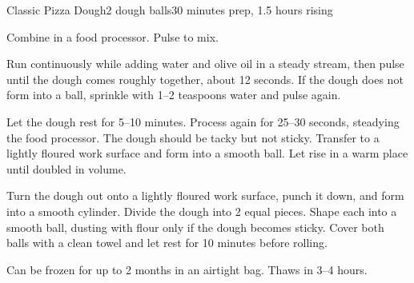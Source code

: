 \documentclass[../Cookbook.tex]{subfiles}
\begin{document}
\begin{recipe}{Classic Pizza Dough}{2 dough balls}{30 minutes prep, 1.5 hours rising}

Combine in a food processor. Pulse to mix.

Run continuously while adding water and olive oil in a steady stream, then pulse until the dough comes roughly together, about 12 seconds. If the dough does not form into a ball, sprinkle with 1--2 teaspoons water and pulse again.

\newstep
Let the dough rest for 5--10 minutes. Process again for 25--30 seconds, steadying the food processor. The dough should be tacky but not sticky. Transfer to a lightly floured work surface and form into a smooth ball. Let rise in a warm place until doubled in volume.

\newstep
Turn the dough out onto a lightly floured work surface, punch it down, and form into a smooth cylinder. Divide the dough into 2 equal pieces. Shape each into a smooth ball, dusting with flour only if the dough becomes sticky. Cover both balls with a clean towel and let rest for 10 minutes before rolling.



Can be frozen for up to 2 months in an airtight bag. Thaws in 3--4 hours.

\end{recipe}
\end{document}
